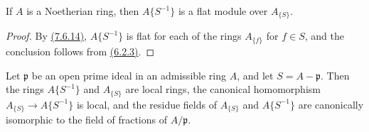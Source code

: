 \begin{prop}[7.6.16]
\label{prop-0.7.6.16}
If $A$ is a Noetherian ring, then $A\{S^{-1}\}$ is a flat module over $A_{\{S\}}$.
\end{prop}

\begin{proof}
\label{proof-prop-0.7.6.16}
By \hyperref[cor-0.7.6.14]{(7.6.14)}, $A\{S^{-1}\}$ is flat for each of the rings $A_{\{f\}}$ for
$f\in S$, and the conclusion follows from \hyperref[env-0.6.2.3]{(6.2.3)}.
\end{proof}

\begin{prop}[7.6.17]
\label{prop-0.7.6.17}
Let $\mathfrak{p}$ be an open prime ideal in an admissible ring $A$, and let $S=A-\mathfrak{p}$.
Then the rings $A\{S^{-1}\}$ and $A_{\{S\}}$ are local rings, the canonical homomorphism
$A_{\{S\}}\to A\{S^{-1}\}$ is local, and the residue fields of $A_{\{S\}}$ and $A\{S^{-1}\}$ are
canonically isomorphic to the field of fractions of $A/\mathfrak{p}$.
\end{prop}

